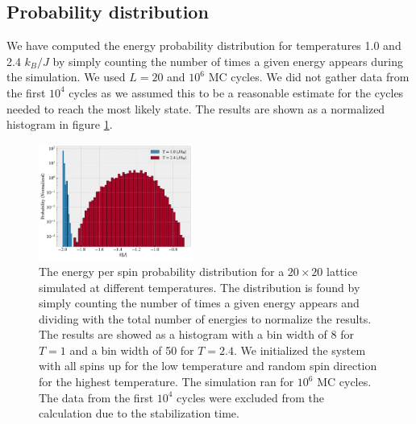 \documentclass[%
 reprint,
nofootinbib,
aps,
]{revtex4-1}
\begin{document}
\subsection{Probability distribution}
We have computed the energy probability distribution for temperatures 1.0 and 2.4 $k_B/J$ by simply counting the number of times a given energy appears during the simulation. We used $L = 20$ and $10^6$ MC cycles. We did not gather data from the first $10^4$ cycles as we assumed this to be a reasonable estimate for the cycles needed to reach the most likely state. The results are shown as a normalized histogram in figure \ref{fig:energy_distribution}.
 \begin{figure}[H]  
  \centering
  \includegraphics[width=0.45\textwidth]{figures/probability_distribution.pdf}
  \caption{The energy per spin probability distribution for a $20\times20$ lattice simulated at different temperatures. The distribution is found by simply counting the number of times a given energy appears and dividing with the total number of energies to normalize the results. The results are showed as a histogram with a bin width of 8 for $T = 1$ and a bin width of 50 for $T = 2.4$. We initialized the system with all spins up for the low temperature and random spin direction for the highest temperature. The simulation ran for $10^6$ MC cycles. The data from the first $10^4$ cycles were excluded from the calculation due to the stabilization time.} 
  \label{fig:energy_distribution}
\end{figure}
\end{document}
